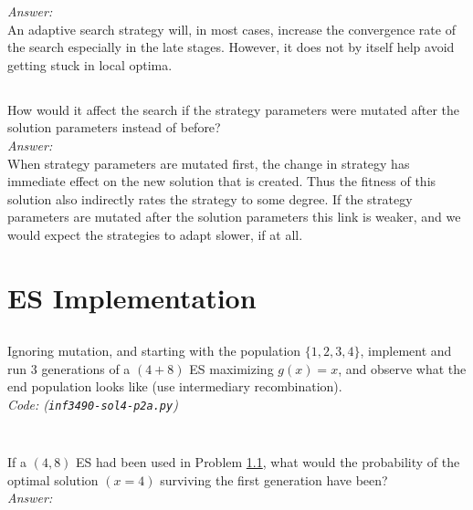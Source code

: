 \textit{Answer:}\\

An adaptive search strategy will, in most cases, increase the convergence rate of the search especially in the late stages.
However, it does not by itself help avoid getting stuck in local optima.

\subsection{} %
How would it affect the search if the strategy parameters were mutated after the solution parameters instead of before?\\

\textit{Answer:}\\

When strategy parameters are mutated first, the change in strategy has immediate effect on the new solution that is created.
Thus the fitness of this solution also indirectly rates the strategy to some degree.
If the strategy parameters are mutated after the solution parameters this link is weaker, and we would expect the strategies to adapt slower, if at all.

\section{ES Implementation} %
\subsection{\marginsymbol} %
\label{subsec:w4e3a}
Ignoring mutation, and starting with the population \(\{1, 2, 3, 4\}\), implement and run 3 generations of a \((4 + 8)\) ES maximizing \(g(x) = x\), and observe what the end population looks like (use intermediary recombination).\\

\textit{Code: (\texttt{inf3490-sol4-p2a.py})}\\
\inputminted{Python}{inf3490-sol4-p2a.py}

\subsection{} %
If a \((4, 8)\) ES had been used in Problem \ref{subsec:w4e3a},
what would the probability of the optimal solution \((x = 4)\) surviving the first generation have been?\\

\textit{Answer:}\\

